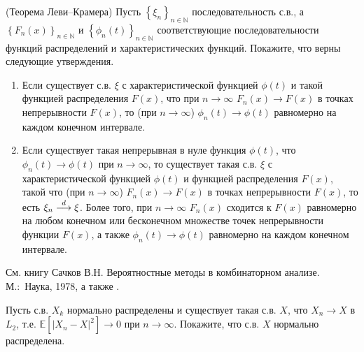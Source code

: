 \begin{problem}\Star(Теорема Леви--Крамера)
\label{levi_kramer}
Пусть $\left\{ {\xi _n } 
\right\}_{n\in { \mathbb{N}}} $ последовательность с.в., а $\left\{ {F_n \left( x 
\right)} \right\}_{n\in { \mathbb{N}}} $ и $\left\{ {\phi _n \left( t \right)} 
\right\}_{n\in { \mathbb{N}}} $ соответствующие последовательности функций 
распределений и характеристических функций. Покажите, что верны следующие утверждения.
\begin{enumerate}
\item Если существует с.в. $\xi $ с характеристической функцией $\phi 
\left( t \right)$ и такой функцией распределения $F\left( x \right)$, что при $n\to\infty$  
$F_n \left( x \right)\to F\left( x \right)$ в точках непрерывности $F\left( 
x \right)$, то (при $n\to\infty$) $\phi _n \left( t \right)\to \phi \left( t \right)$ 
равномерно на каждом конечном интервале.
\item Если существует такая непрерывная в нуле функция $\phi \left( t 
\right)$, что $\phi _n \left( t \right)\to \phi \left( t \right)$ при $n\to\infty$, то 
существует такая с.в. $\xi $ с характеристической функцией $\phi \left( t 
\right)$ и функцией распределения $F\left( x \right)$, такой что (при $n\to\infty$)  $F_n \left( x 
\right)\to F\left( x \right)$ в точках непрерывности $F\left( x \right)$, то 
есть $\xi _n \buildrel d \over \longrightarrow \xi $. Более того, при $n\to\infty$  
$F_n \left( x \right)$ сходится к $ F\left( x \right)$ равномерно на любом конечном или 
бесконечном множестве точек непрерывности функции $F\left( x \right)$, а 
также $\phi _n \left( t \right)\to \phi \left( t \right)$ равномерно на 
каждом конечном интервале.
\end{enumerate}

\end{problem}
\begin{remark}
См. книгу Сачков В.Н. Вероятностные методы в комбинаторном анализе. М.:~Наука, 1978, а также \cite{Gupta,21,stoianov}.
\end{remark}

\begin{problem}
Пусть с.в. $X_k$ нормально распределены и существует такая с.в. $X$, что $X_n \to X$ в $L_2$, т.е. $\mathbb{E} \left[|X_n-X |^2\right] \to 0$ при $n\to\infty$. Покажите, что с.в. $X$  нормально распределена.
\end{problem}

